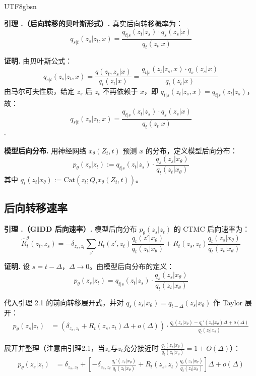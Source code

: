 \documentclass[11pt,a4paper]{article}
\newcounter{lemma}[section]
\renewcommand{\thelemma}{\thesection.\arabic{lemma}}
\begin{document}
\begin{CJK}{UTF8}{gbsn}
\begin{lembox}
\textbf{引理 \thelemma（后向转移的贝叶斯形式）.} 真实后向转移概率为：
\[
q_{s|t}(z_s|z_t, x) = \frac{q_{t|s}(z_t|z_s) \cdot q_s(z_s|x)}{q_t(z_t|x)}
\]
\end{lembox}

\textbf{证明.} 由贝叶斯公式：
\[
q_{s|t}(z_s|z_t, x) = \frac{q(z_t, z_s|x)}{q_t(z_t|x)} = \frac{q_{t|s}(z_t|z_s, x) \cdot q_s(z_s|x)}{q_t(z_t|x)}
\]
由马尔可夫性质，给定 $z_s$ 后 $z_t$ 不再依赖于 $x$，即 $q_{t|s}(z_t|z_s, x) = q_{t|s}(z_t|z_s)$，故：
\[
q_{s|t}(z_s|z_t, x) = \frac{q_{t|s}(z_t|z_s) \cdot q_s(z_s|x)}{q_t(z_t|x)}
\]
\hfill $\square$

\textbf{模型后向分布.} 用神经网络 $x_\theta(Z_t, t)$ 预测 $x$ 的分布，定义模型后向分布：
\[
p_\theta(z_s|z_t) := q_{t|s}(z_t|z_s) \cdot \frac{q_s(z_s|x_\theta)}{q_t(z_t|x_\theta)}
\]
其中 $q_t(z_t|x_\theta) := \mathrm{Cat}(z_t; Q_t x_\theta(Z_t, t))$。

\subsection{后向转移速率}

\begin{lembox}
\textbf{引理 \thelemma（GIDD 后向速率）.} 模型后向分布 $p_\theta(z_s|z_t)$ 的 CTMC 后向速率为：
\[
\hat{R}_t^\theta(z_t, z_s) = -\delta_{z_s,z_t} \sum_{z'} R_t(z', z_t) \frac{q_t(z'|x_\theta)}{q_t(z_t|x_\theta)} + R_t(z_s, z_t)\frac{q_t(z_s|x_\theta)}{q_t(z_t|x_\theta)}
\]
\end{lembox}

\textbf{证明.} 设 $s = t - \Delta$，$\Delta \to 0$。由模型后向分布的定义：
\[
p_\theta(z_s|z_t) = q_{t|s}(z_t|z_s) \cdot \frac{q_s(z_s|x_\theta)}{q_t(z_t|x_\theta)}
\]

代入引理 2.1 的前向转移展开式，并对 $q_s(z_s|x_\theta) = q_{t-\Delta}(z_s|x_\theta)$ 作 Taylor 展开：
\begin{align*}
p_\theta(z_s|z_t) &= \left(\delta_{z_s,z_t} + R_t(z_s, z_t)\Delta + o(\Delta)\right) \cdot \frac{q_t(z_s|x_\theta) - q_t'(z_s|x_\theta)\Delta + o(\Delta)}{q_t(z_t|x_\theta)}
\end{align*}

展开并整理（注意由引理2.1，当$z_s$与$z_t$充分接近时 $\frac{q_t(z_s|x_\theta)}{q_t(z_t|x_\theta)} = 1+O(\Delta)$）：
\begin{align*}
p_\theta(z_s|z_t) &= \delta_{z_s,z_t} + \left[-\delta_{z_s,z_t}\frac{q_t'(z_s|x_\theta)}{q_t(z_t|x_\theta)} + R_t(z_s,z_t)\frac{q_t(z_s|x_\theta)}{q_t(z_t|x_\theta)}\right]\Delta + o(\Delta)
\end{align*}


\end{CJK}
\end{document}
